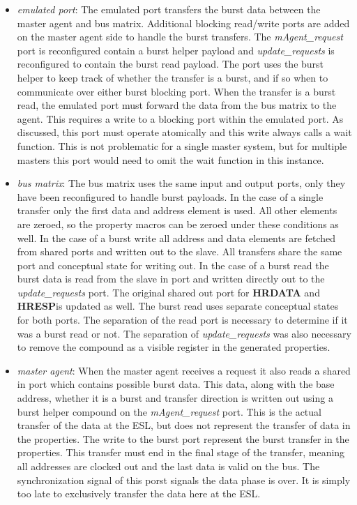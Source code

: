 \begin{itemize}
 \item \textit{emulated port}: The emulated port transfers the burst data between the master agent and bus matrix. Additional blocking read/write ports are added on the master agent side to handle the burst transfers. The \textit{mAgent\_request} port is reconfigured contain a burst helper payload and \textit{update\_requests} is reconfigured to contain the burst read payload. The port uses the burst helper to keep track of whether the transfer is a burst, and if so when to communicate over either burst blocking port. When the transfer is a burst read, the emulated port must forward the data from the bus matrix to the agent. This requires a write to a blocking port within the emulated port. As discussed, this port must operate atomically and this write always calls a wait function. This is not problematic for a single master system, but for multiple masters this port would need to omit the wait function in this instance.       
 \item \textit{bus matrix}: The bus matrix uses the same input and output ports, only they have been reconfigured to handle burst payloads. In the case of a single transfer only the first data and address element is used. All other elements are zeroed, so the property macros can be zeroed under these conditions as well. In the case of a burst write all address and data elements are fetched from shared ports and written out to the slave. All transfers share the same port and conceptual state for writing out. In the case of a burst read the burst data is read from the slave in port and written directly out to the \textit{update\_requests} port. The original shared out port for \textbf{HRDATA} and \textbf{HRESP}is updated as well. The burst read uses separate conceptual states for both ports. The separation of the read port is necessary to determine if it was a burst read or not. The separation of \textit{update\_requests} was also necessary to remove the compound as a visible register in the generated properties. 
 \item \textit{master agent}: When the master agent receives a request it also reads a shared in port which contains possible burst data. This data, along with
the base address, whether it is a burst and transfer direction is written out using a burst helper compound on the \textit{mAgent\_request} port. This is the actual transfer of the data at the ESL, but does not represent the transfer of data in the properties. The write to the burst port represent the burst transfer in the properties. This transfer must end in the final stage of the transfer, meaning all addresses are clocked out and the last data is valid on the bus. The synchronization signal of this porst signals the data phase is over. It is simply too late to exclusively transfer the data here at the ESL.   
\end{itemize}     

